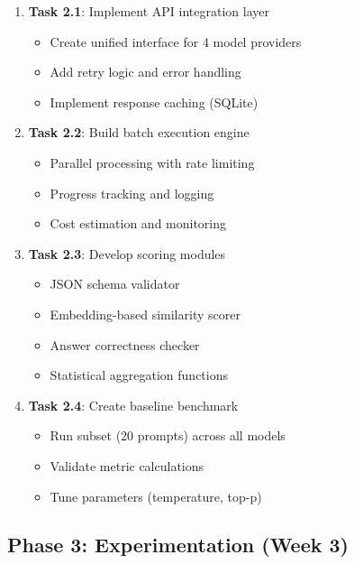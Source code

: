\documentclass[11pt,a4paper]{article}
\begin{document}
\begin{enumerate}[leftmargin=*]
    \item \textbf{Task 2.1}: Implement API integration layer
    \begin{itemize}
        \item Create unified interface for 4 model providers
        \item Add retry logic and error handling
        \item Implement response caching (SQLite)
    \end{itemize}
    
    \item \textbf{Task 2.2}: Build batch execution engine
    \begin{itemize}
        \item Parallel processing with rate limiting
        \item Progress tracking and logging
        \item Cost estimation and monitoring
    \end{itemize}
    
    \item \textbf{Task 2.3}: Develop scoring modules
    \begin{itemize}
        \item JSON schema validator
        \item Embedding-based similarity scorer
        \item Answer correctness checker
        \item Statistical aggregation functions
    \end{itemize}
    
    \item \textbf{Task 2.4}: Create baseline benchmark
    \begin{itemize}
        \item Run subset (20 prompts) across all models
        \item Validate metric calculations
        \item Tune parameters (temperature, top-p)
    \end{itemize}
\end{enumerate}

\subsection{Phase 3: Experimentation (Week 3)}
\end{document}
